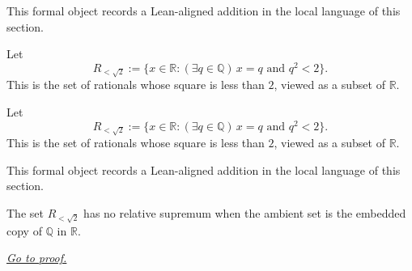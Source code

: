 \begin{remark*}[Interpretation]
This formal object records a Lean-aligned addition in the local language of this section.
\end{remark*}

\begin{dependencies}
\NoLocalDependencies
\end{dependencies}
\begin{definition}
\label{def:rationals-with-square-less-than-two-in-r}
Let
\[
  R_{<\sqrt2}:=\{x\in\mathbb R:(\exists q\in\mathbb Q)\, x=q \text{ and } q^2<2\}.
\]
This is the set of rationals whose square is less than $2$, viewed as a subset of $\mathbb R$.
\end{definition}

\begin{remark*}
Let
\[
  R_{<\sqrt2}:=\{x\in\mathbb R:(\exists q\in\mathbb Q)\, x=q \text{ and } q^2<2\}.
\]
This is the set of rationals whose square is less than $2$, viewed as a subset of $\mathbb R$.
\end{remark*}

\begin{remark*}[Interpretation]
This formal object records a Lean-aligned addition in the local language of this section.
\end{remark*}

\begin{dependencies}
\NoLocalDependencies
\end{dependencies}
\begin{theorem}
\label{thm:no-relative-supremum-of-rationals-example}
The set $R_{<\sqrt2}$ has no relative supremum when the ambient set is the embedded copy of $\mathbb Q$ in $\mathbb R$.

\smallskip
\noindent
\hyperref[prf:no-relative-supremum-of-rationals-example]{\textit{Go to proof.}}
\end{theorem}

